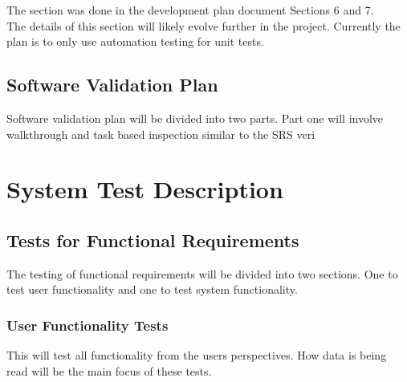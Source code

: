 \documentclass[12pt, titlepage]{article}
\begin{document}


The section was done in the development plan document Sections 6 and 7. \\

The details of this section will likely evolve further
in the project. Currently the plan is to only use 
automation testing for unit tests. 

\subsection{Software Validation Plan}

  
Software validation plan will be divided into two parts. Part one will involve walkthrough and task based inspection similar to the SRS veri



\section{System Test Description}
	
\subsection{Tests for Functional Requirements}

The testing of functional requirements will be divided into two sections. One to test user functionality and one to test system functionality. 

\subsubsection{User Functionality Tests}

This will test all functionality from the users perspectives. How data is being read will be the main focus of these tests. 
		
\end{document}
